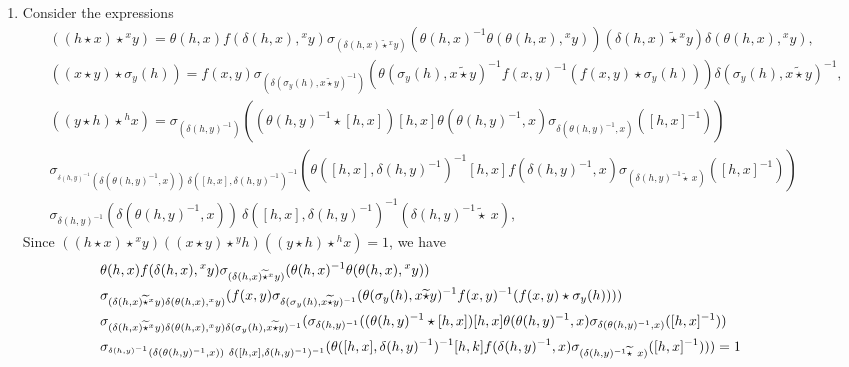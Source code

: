 \documentclass[10 pt,oneside,reqno,a4paper]{amsart}
\numberwithin{equation}{section}
\begin{document}
\begin{enumerate}
\item Consider the expressions 
\begin{align*}
    &((h \star x) \star {^xy}) = \theta(h,x) f(\delta(h,x), {^xy}) \sigma_{(\delta(h,x) \widetilde{\star} {^xy})}(\theta(h,x)^{-1}\theta( \theta(h,x), {^xy})) (\delta(h,x) \widetilde{\star} {^xy}) \delta(\theta(h,x), {^xy}),\\
   & ((x \star y) \star {\sigma_y(h)})= f(x,y) \sigma_{(\delta({\sigma_y(h)}, x \widetilde{\star} y)^{-1})}(\theta({\sigma_y(h)},x \widetilde{\star} y )^{-1} f(x,y)^{-1}(f(x,y) \star {\sigma_y(h)})) \delta({\sigma_y(h)}, x \widetilde{\star} y)^{-1},\\
   & ((y \star h) \star {^hx}) = {\sigma_{(\delta(h,y)^{-1})}((\theta(h,y)^{-1} \star [h,x]) [h,x]\theta(\theta(h,y)^{-1},x) \sigma_{\delta(\theta(h,y)^{-1},x)}([h,x]^{-1}))} \\
   & \sigma_{^{\delta(h,y)^{-1}}(\delta(\theta(h,y)^{-1},x)) ~ \delta([h,x], \delta(h,y)^{-1})^{-1}}(\theta([h,x],\delta(h,y)^{-1})^{-1} [h,x] f(\delta(h,y)^{-1},x) \sigma_{(\delta(h,y)^{-1} \widetilde{\star} ~x)}([h,x]^{-1})) \\& \sigma_{\delta(h,y)^{-1}}(\delta(\theta(h,y)^{-1},x)) ~ \delta([h,x], \delta(h,y)^{-1})^{-1} (\delta(h,y)^{-1}\widetilde{\star} ~x),
\end{align*}
Since $((h \star x) \star {^xy})((x \star y) \star {^yh})((y \star h) \star {^hx})=1$, we have
\begin{align}
  & \hspace{-1cm} \theta(h,x) f(\delta(h,x), {^xy}) \sigma_{(\delta(h,x) \widetilde{\star} {^xy})}(\theta(h,x)^{-1}\theta( \theta(h,x), {^xy})) \notag\\ & \hspace{-1cm} \sigma_{(\delta(h,x) \widetilde{\star} {^xy}) \delta(\theta(h,x), {^xy})} (f(x,y) \sigma_{\delta({\sigma_y(h)}, x \widetilde{\star} y)^{-1}}(\theta({\sigma_y(h)},x \widetilde{\star} y )^{-1} f(x,y)^{-1}(f(x,y) \star {\sigma_y(h)}))) \notag\\ & \hspace{-1cm} \sigma_{(\delta(h,x) \widetilde{\star} {^xy}) \delta(\theta(h,x), {^xy}) \delta({\sigma_y(h)}, x \widetilde{\star} y)^{-1}}({\sigma_{\delta(h,y)^{-1}}((\theta(h,y)^{-1} \star [h,x]) [h,x]\theta(\theta(h,y)^{-1},x)  \sigma_{\delta(\theta(h,y)^{-1},x)}([h,x]^{-1}))} \notag\\ & \hspace{-1cm}
   \sigma_{^{\delta(h,y)^{-1}}(\delta(\theta(h,y)^{-1},x)) ~ \delta([h,x], \delta(h,y)^{-1})^{-1}}(\theta([h,x],\delta(h,y)^{-1})^{-1} [h,k] f(\delta(h,y)^{-1},x) \sigma_{(\delta(h,y)^{-1} \widetilde{\star} ~x)}([h,x]^{-1}))) =1 \notag \\ 

\end{align}
\end{enumerate}
\end{document}
